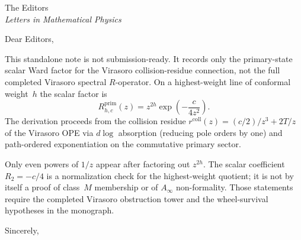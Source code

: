 \documentclass[11pt]{letter}
\date{\today}
\begin{document}
\begin{letter}{The Editors\\
\emph{Letters in Mathematical Physics}}

\opening{Dear Editors,}

This standalone note is not submission-ready. It records only the
primary-state scalar Ward factor for the Virasoro collision-residue
connection, not the full completed Virasoro spectral $R$-operator.
On a highest-weight line of conformal weight~$h$ the scalar factor is
\[
R^{\mathrm{prim}}_{h,c}(z)
= z^{2h}\exp\!\left(-\frac{c}{4z^2}\right).
\]
The derivation proceeds from the collision residue
$r^{\mathrm{coll}}(z) = (c/2)/z^3 + 2T/z$ of the Virasoro OPE via
$d\log$ absorption (reducing pole orders by one) and path-ordered
exponentiation on the commutative primary sector.

Only even powers of $1/z$ appear after factoring out $z^{2h}$. The
scalar coefficient $R_2=-c/4$ is a normalization check for the
highest-weight quotient; it is not by itself a proof of class~$M$
membership or of $A_\infty$ non-formality. Those statements require
the completed Virasoro obstruction tower and the wheel-survival
hypotheses in the monograph.

\closing{Sincerely,}

\end{letter}
\end{document}
